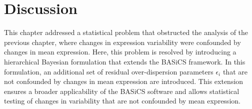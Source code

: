 
\section{Discussion}

This chapter addressed a statistical problem that obstructed the analysis of the previous chapter, where changes in expression variability were confounded by changes in mean expression. 
Here, this problem is resolved by introducing a hierarchical Bayesian formulation that extends the BASiCS framework. 
In this formulation, an additional set of residual over-dispersion parameters $\epsilon_i$ that are not confounded by changes in mean expression are introduced. 
This extension ensures a broader applicability of the BASiCS software and allows statistical testing of changes in variability that are not confounded by mean expression.  \\ 

